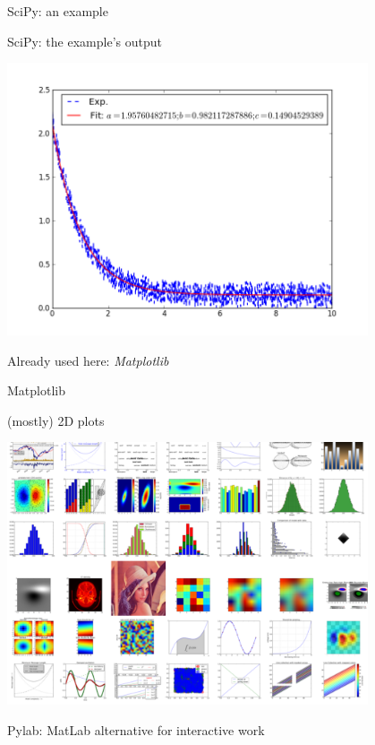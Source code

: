 \begin{frame}[fragile]{SciPy: an example}



\end{frame}

\begin{frame}{SciPy: the example's output}

\begin{center}
	\includegraphics[width=0.8\textwidth]{Figures/fit-png}
\end{center}

Already used here: \emph{Matplotlib}

\end{frame}

\begin{frame}{Matplotlib}

(mostly) 2D plots

\begin{center}
\includegraphics[width=0.8\textwidth]{Figures/mpl}
\end{center}

Pylab: MatLab alternative for interactive work
\end{frame}

